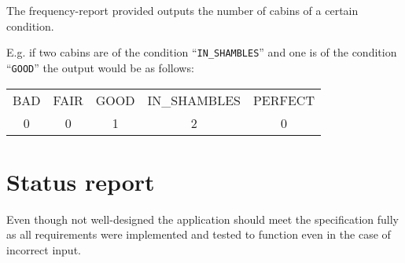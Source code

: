 The frequency-report provided outputs the number of cabins of a certain condition.

E.g. if two cabins are of the condition ``\texttt{IN\_SHAMBLES}'' and one is of the condition ``\texttt{GOOD}'' the output would be as follows:

\begin{tabular}{c|c|c|c|c}
BAD & FAIR & GOOD & IN\_SHAMBLES & PERFECT \\ 
0 & 0 & 1 & 2 & 0 \\ 
\end{tabular}

\section{Status report}
\label{sec:status_report}

Even though not well-designed the application should meet the specification fully as all requirements were implemented and tested to function even in the case of incorrect input.
